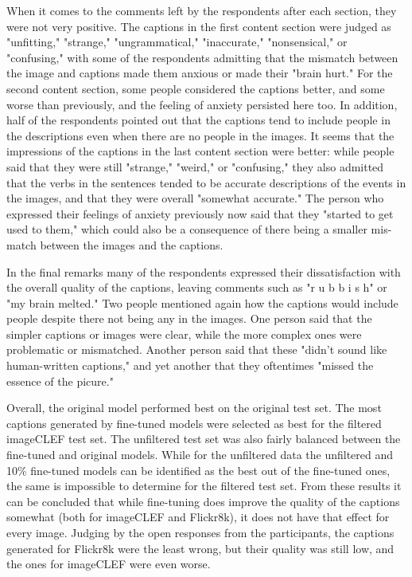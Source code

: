 \documentclass[11pt]{article}
\begin{document}
When it comes to the comments left by the respondents after each section, they were not very positive. The captions in the first content section were judged as "unfitting," "strange," "ungrammatical," "inaccurate," "nonsensical," or "confusing," with some of the respondents admitting that the mismatch between the image and captions made them anxious or made their "brain hurt." For the second content section, some people considered the captions better, and some worse than previously, and the feeling of anxiety persisted here too. In addition, half of the respondents pointed out that the captions tend to include people in the descriptions even when there are no people in the images. It seems that the impressions of the captions in the last content section were better: while people said that they were still "strange," "weird," or "confusing," they also admitted that the verbs in the sentences tended to be accurate descriptions of the events in the images, and that they were overall "somewhat accurate." The person who expressed their feelings of anxiety previously now said that they "started to get used to them," which could also be a consequence of there being a smaller mis-match between the images and the captions. 

In the final remarks many of the respondents expressed their dissatisfaction with the overall quality of the captions, leaving comments such as "r u b b i s h" or "my brain melted." Two people mentioned again how the captions would include people despite there not being any in the images. One person said that the simpler captions or images were clear, while the more complex ones were problematic or mismatched. Another person said that these "didn't sound like human-written captions," and yet another that they oftentimes "missed the essence of the picure."  

Overall, the original model performed best on the original test set. The most captions generated by fine-tuned models were selected as best for the filtered imageCLEF test set. The unfiltered test set was also fairly balanced between the fine-tuned and original models. While for the unfiltered data the unfiltered and 10\% fine-tuned models can be identified as the best out of the fine-tuned ones, the same is impossible to determine for the filtered test set. From these results it can be concluded that while fine-tuning does improve the quality of the captions somewhat (both for imageCLEF and Flickr8k), it does not have that effect for every image. Judging by the open responses from the participants, the captions generated for Flickr8k were the least wrong, but their quality was still low, and the ones for imageCLEF were even worse. 
\end{document}
